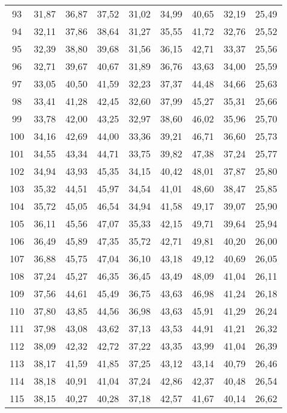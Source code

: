 \begin{longtable}{c c c c c c c c c}
      93	& 31,87	& 36,87	& 37,52	& 31,02	& 34,99	& 40,65	& 32,19	& 25,49 \\
      94	& 32,11	& 37,86	& 38,64	& 31,27	& 35,55	& 41,72	& 32,76	& 25,52 \\
      95	& 32,39	& 38,80	& 39,68	& 31,56	& 36,15	& 42,71	& 33,37	& 25,56 \\
      96	& 32,71	& 39,67	& 40,67	& 31,89	& 36,76	& 43,63	& 34,00	& 25,59 \\
      97	& 33,05	& 40,50	& 41,59	& 32,23	& 37,37	& 44,48	& 34,66	& 25,63 \\
      98	& 33,41	& 41,28	& 42,45	& 32,60	& 37,99	& 45,27	& 35,31	& 25,66 \\
      99	& 33,78	& 42,00	& 43,25	& 32,97	& 38,60	& 46,02	& 35,96	& 25,70 \\
      100& 	34,16& 	42,69& 	44,00& 	33,36& 	39,21& 	46,71& 	36,60& 	25,73 \\
      101& 	34,55& 	43,34& 	44,71& 	33,75& 	39,82& 	47,38& 	37,24& 	25,77 \\
      102& 	34,94& 	43,93& 	45,35& 	34,15& 	40,42& 	48,01& 	37,87& 	25,80 \\
      103& 	35,32& 	44,51& 	45,97& 	34,54& 	41,01& 	48,60& 	38,47& 	25,85 \\
      104& 	35,72& 	45,05& 	46,54& 	34,94& 	41,58& 	49,17& 	39,07& 	25,90 \\
      105& 	36,11& 	45,56& 	47,07& 	35,33& 	42,15& 	49,71& 	39,64& 	25,94 \\
      106& 	36,49& 	45,89& 	47,35& 	35,72& 	42,71& 	49,81& 	40,20& 	26,00 \\
      107& 	36,88& 	45,75& 	47,04& 	36,10& 	43,18& 	49,12& 	40,69& 	26,05 \\
      108& 	37,24& 	45,27& 	46,35& 	36,45& 	43,49& 	48,09& 	41,04& 	26,11 \\
      109& 	37,56& 	44,61& 	45,49& 	36,75& 	43,63& 	46,98& 	41,24& 	26,18 \\
      110& 	37,80& 	43,85& 	44,56& 	36,98& 	43,63& 	45,91& 	41,29& 	26,24 \\
      111& 	37,98& 	43,08& 	43,62& 	37,13& 	43,53& 	44,91& 	41,21& 	26,32 \\
      112& 	38,09& 	42,32& 	42,72& 	37,22& 	43,35& 	43,99& 	41,04& 	26,39 \\
      113& 	38,17& 	41,59& 	41,85& 	37,25& 	43,12& 	43,14& 	40,79& 	26,46 \\
      114& 	38,18& 	40,91& 	41,04& 	37,24& 	42,86& 	42,37& 	40,48& 	26,54 \\
      115& 	38,15& 	40,27& 	40,28& 	37,18& 	42,57& 	41,67& 	40,14& 	26,62 \\

\end{longtable}
